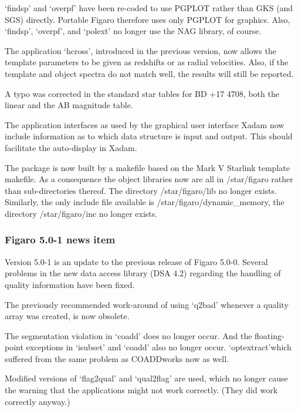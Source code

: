    `findsp' and `overpf' have been re-coded to use PGPLOT rather than
   GKS (and SGS) directly. Portable Figaro therefore uses only PGPLOT for
   graphics. Also, `findsp', `overpf', and `polext' no longer use
   the NAG library, of course.


   The application `hcross', introduced in the previous version, now
   allows the template parameters to be given as redshifts or as radial
   velocities. Also, if the template and object spectra do not match
   well, the results will still be reported.


   A typo was corrected in the standard star tables for BD +17 4708, both
   the linear and the AB magnitude table.

   The application interfaces as used by the graphical user interface
   Xadam now include information as to which data structure is input and
   output. This should facilitate the auto-display in Xadam.

   The package is now built by a makefile based on the Mark V Starlink
   template makefile. As a consequence the object libraries now are all
   in /star/figaro rather than sub-directories thereof. The directory
   /star/figaro/lib no longer exists. Similarly, the only include file
   available is /star/figaro/dynamic\_memory, the directory
   /star/figaro/inc no longer exists.


\subsubsection{\label{news501}Figaro 5.0-1 news item}

   Version 5.0-1 is an update to the previous release of Figaro
   5.0-0. Several problems in the new data access library (DSA 4.2)
   regarding the handling of quality information have been fixed.

   The previously recommended work-around of using `q2bad' whenever a
   quality array was created, is now obsolete.

   The segmentation violation in `coadd' does no longer occur. And the
   floating-point exceptions in `isubset' and `coadd' also no longer
   occur. `optextract'\latorhtm{---}{-}which suffered from the same
   problem as COADD\latorhtm{---}{-}works now as well.

   Modified versions of `flag2qual' and `qual2flag' are used, which no
   longer cause the warning that the applications might not work
   correctly. (They did work correctly anyway.)

